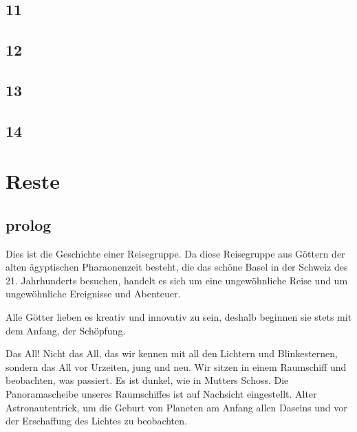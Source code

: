 \documentclass[11pt,titlepage,a5paper]{book}
\begin{document}
\section*{11}

\section*{12}

\section*{13}

\section*{14}











\chapter*{Reste}

\section*{prolog}

Dies ist die Geschichte einer Reisegruppe. Da diese Reisegruppe aus Göttern der alten ägyptischen Pharaonenzeit besteht, die das schöne Basel in der Schweiz des 21. Jahrhunderts besuchen, handelt es sich um eine ungewöhnliche Reise und um ungewöhnliche Ereignisse und Abenteuer. 

Alle Götter lieben es kreativ und innovativ zu sein, deshalb beginnen sie stets mit dem Anfang, der Schöpfung. 

Das All!  Nicht das All, das wir kennen mit all den Lichtern und Blinkesternen, sondern das All vor Urzeiten, jung und neu. Wir sitzen in einem Raumschiff und beobachten, was passiert. Es ist dunkel, wie in Mutters Schoss. Die Panoramascheibe unseres Raumschiffes ist auf Nachsicht eingestellt. Alter Astronautentrick, um die Geburt von Planeten am Anfang allen Daseins und vor der Erschaffung des Lichtes zu beobachten.
\end{document}

